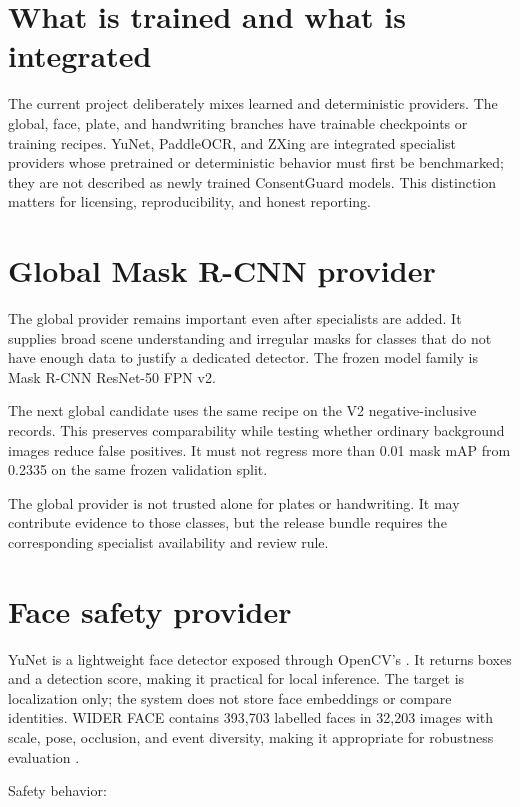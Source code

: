 \section{What is trained and what is integrated}

The current project deliberately mixes learned and deterministic providers. The global, face, plate, and handwriting branches have trainable checkpoints or training recipes. YuNet, PaddleOCR, and ZXing are integrated specialist providers whose pretrained or deterministic behavior must first be benchmarked; they are not described as newly trained ConsentGuard models. This distinction matters for licensing, reproducibility, and honest reporting.

\section{Global Mask R-CNN provider}

The global provider remains important even after specialists are added. It supplies broad scene understanding and irregular masks for classes that do not have enough data to justify a dedicated detector. The frozen model family is Mask R-CNN ResNet-50 FPN v2.

The next global candidate uses the same recipe on the V2 negative-inclusive records. This preserves comparability while testing whether ordinary background images reduce false positives. It must not regress more than 0.01 mask mAP from 0.2335 on the same frozen validation split.

The global provider is not trusted alone for plates or handwriting. It may contribute evidence to those classes, but the release bundle requires the corresponding specialist availability and review rule.

\section{Face safety provider}

YuNet is a lightweight face detector exposed through OpenCV's . It returns boxes and a detection score, making it practical for local inference. The target is localization only; the system does not store face embeddings or compare identities. WIDER FACE contains 393,703 labelled faces in 32,203 images with scale, pose, occlusion, and event diversity, making it appropriate for robustness evaluation \citep{yang2016wider}.

Safety behavior:

